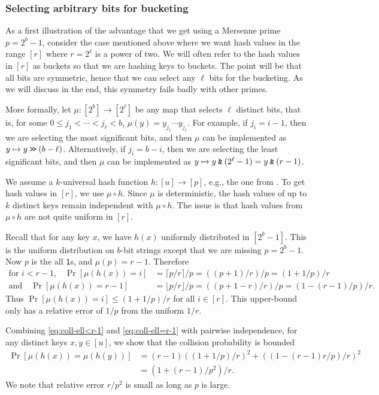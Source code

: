 \subsubsection{Selecting arbitrary bits for bucketing}\label{sec:power-of-two}
As a first illustration of the advantage that we get using a Mersenne
prime $p=2^b-1$, consider the case mentioned above where we want hash
values in the range $[r]$ where $r=2^\ell$ is a power of two. We will
often refer to the hash values in $[r]$ as buckets so that we are
hashing keys to buckets. The point will be that all bits are
symmetric, hence that we can select any $\ell$ bits for the
bucketing. As we will discuss in the end, this symmetry fails badly
with other primes.

More formally, let $\mu:[2^b]\to[2^\ell]$ be any map that selects
$\ell$ distinct bits, that is, for some $0\leq j_1<\cdots<j_{\ell}<b$,
$\mu(y)=y_{j_1}\cdots y_{j_\ell}$. For example, if $j_i=i-1$, then we
are selecting the most significant bits, and then $\mu$ can be
implemented as $y\mapsto y\mathbin{\texttt{>\!>}} (b-\ell)$. Alternatively, if $j_i=b-i$,
then we are selecting the least significant bits, and then $\mu$ can
be implemented as $y\mapsto y\mathbin{\texttt{\&}} (2^\ell-1)=y\mathbin{\texttt{\&}} (r-1)$.


We assume a $k$-universal hash function $h:[u]\to[p]$, e.g.,
the one from . To get hash values in $[r]$,
we use $\mu\circ h$. Since $\mu$ is deterministic,
the hash values of up to $k$ distinct keys remain
independent with $\mu\circ h$. The issue is that hash values from 
$\mu\circ h$ are not quite uniform in $[r]$.

Recall that for any key $x$, we have $h(x)$ uniformly distributed in $[2^b-1]$.
This is the uniform distribution on $b$-bit strings except that we are
missing $p=2^b-1$. Now $p$ is the all \texttt{1}s, and 
$\mu(p) = r-1$.
Therefore
\begin{align}
   \text{for $i < r-1$,}\quad
   \Pr[\mu(h(x))=i]
   &=\lceil p/r\rceil/p
   =((p+1)/r)/p
   =(1+1/p)/r
   \label{eq:coll-ell<r-1}
   \\
   \text{and}\quad
     \Pr[\mu(h(x))=r-1]
   &=\lfloor p/r\rfloor/p=((p+1-r)/r)/p
   =(1-(r-1)/p)/r.
   \label{eq:coll-ell=r-1}
\end{align}
Thus $\Pr[\mu(h(x))=i]\leq (1+1/p)/r$ for all $i\in[r]$. This upper-bound
only has a relative error of $1/p$ from the uniform $1/r$.

Combining \eqref{eq:coll-ell<r-1} and \eqref{eq:coll-ell=r-1} with
pairwise independence, for any distinct keys $x,y\in [u]$, we show that the
collision probability is bounded
\begin{align}
   \Pr[\mu(h(x))=\mu(h(y))]
      &=(r-1)((1+1/p)/r)^2+((1-(r-1)r/p)/r)^2 \nonumber
       \\&=(1+(r-1)/p^2)/r
   .\label{eq:coll}
\end{align}
We note that relative error $r/p^2$ is small as long as $p$ is
large.

